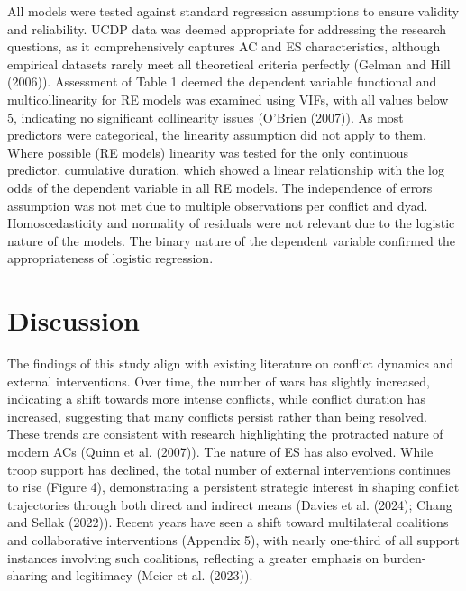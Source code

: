 \documentclass[
]{article}
\begin{document}
All models were tested against standard regression assumptions to ensure
validity and reliability. UCDP data was deemed appropriate for
addressing the research questions, as it comprehensively captures AC and
ES characteristics, although empirical datasets rarely meet all
theoretical criteria perfectly (Gelman and Hill (2006)). Assessment of
Table 1 deemed the dependent variable functional and multicollinearity
for RE models was examined using VIFs, with all values below 5,
indicating no significant collinearity issues (O'Brien (2007)). As most
predictors were categorical, the linearity assumption did not apply to
them. Where possible (RE models) linearity was tested for the only
continuous predictor, cumulative duration, which showed a linear
relationship with the log odds of the dependent variable in all RE
models. The independence of errors assumption was not met due to
multiple observations per conflict and dyad. Homoscedasticity and
normality of residuals were not relevant due to the logistic nature of
the models. The binary nature of the dependent variable confirmed the
appropriateness of logistic regression.

\section{Discussion}\label{discussion}

The findings of this study align with existing literature on conflict
dynamics and external interventions. Over time, the number of wars has
slightly increased, indicating a shift towards more intense conflicts,
while conflict duration has increased, suggesting that many conflicts
persist rather than being resolved. These trends are consistent with
research highlighting the protracted nature of modern ACs (Quinn et al.
(2007)). The nature of ES has also evolved. While troop support has
declined, the total number of external interventions continues to rise
(Figure 4), demonstrating a persistent strategic interest in shaping
conflict trajectories through both direct and indirect means (Davies et
al. (2024); Chang and Sellak (2022)). Recent years have seen a shift
toward multilateral coalitions and collaborative interventions (Appendix
5), with nearly one-third of all support instances involving such
coalitions, reflecting a greater emphasis on burden-sharing and
legitimacy (Meier et al. (2023)).
\end{document}
